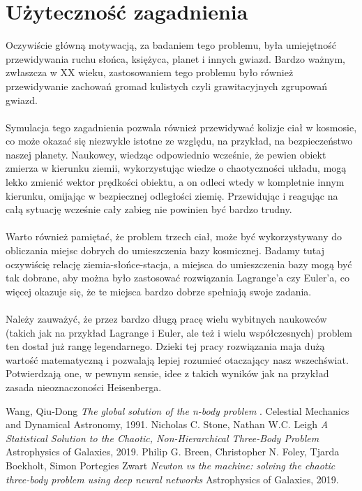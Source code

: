 \documentclass{article}
\begin{document}
\section{Użyteczność zagadnienia}
 Oczywiście główną motywacją, za badaniem tego problemu, była umiejętność przewidywania ruchu słońca, księżyca, planet i innych gwiazd. Bardzo ważnym, zwłaszcza w XX wieku, zastosowaniem tego problemu było również przewidywanie zachowań gromad kulistych czyli grawitacyjnych zgrupowań gwiazd.\\\\Symulacja tego zagadnienia pozwala również przewidywać kolizje ciał w kosmosie, co może okazać się niezwykle istotne ze względu, na przykład, na bezpieczeństwo naszej planety. Naukowcy, wiedząc odpowiednio wcześnie, że pewien obiekt zmierza w kierunku ziemii, wykorzystując wiedze o chaotyczności układu, mogą lekko zmienić wektor prędkości obiektu, a on odleci wtedy w kompletnie innym kierunku, omijając w bezpiecznej odległości ziemię. Przewidując i reagując na całą sytuację wcześnie cały zabieg nie powinien być bardzo trudny.\\\\ Warto również pamiętać, że problem trzech ciał, może być wykorzystywany do obliczania miejsc dobrych do umieszczenia bazy kosmicznej. Badamy tutaj oczywiścię relację ziemia-słońce-stacja, a miejsca do umieszczenia bazy mogą być tak dobrane, aby można było zastosować rozwiązania Lagrange'a czy Euler'a, co więcej okazuje się, że te miejsca bardzo dobrze spełniają swoje zadania.\\\\
 Należy zauważyć, że przez bardzo długą pracę wielu wybitnych naukowców (takich jak na przykład Lagrange i Euler, ale też i wielu współczesnych) problem ten dostał już rangę legendarnego. Dzieki tej pracy rozwiązania maja dużą wartość matematyczną i pozwalają lepiej rozumieć otaczający nasz wszechświat. Potwierdzają one, w pewnym sensie, idee z takich wyników jak na przykład zasada nieoznaczoności Heisenberga. 

\clearpage
\begin{thebibliography}{9}
Wang, Qiu-Dong 
\textit{ The global solution of the n-body problem }. 
Celestial Mechanics and Dynamical Astronomy, 1991.
Nicholas C. Stone, Nathan W.C. Leigh
\textit{A Statistical Solution to the Chaotic, Non-Hierarchical Three-Body Problem}
Astrophysics of Galaxies, 2019.
Philip G. Breen, Christopher N. Foley, Tjarda Boekholt, Simon Portegies Zwart
\textit{Newton vs the machine: solving the chaotic three-body problem using deep neural networks}
Astrophysics of Galaxies, 2019.
\end{thebibliography}
\end{document}
